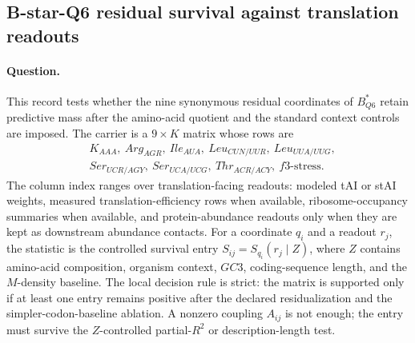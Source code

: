 \subsection{B-star-Q6 residual survival against translation readouts}
\label{sec:bioreality-translation-survival-b-star-q6-survival-matrix}

\paragraph{Question.}
This record tests whether the nine synonymous residual coordinates of $B^*_{Q6}$ retain predictive mass after the amino-acid quotient and the standard context controls are imposed.  The carrier is a $9 \times K$ matrix whose rows are
$$
\begin{aligned}
&K_{AAA},\ Arg_{AGR},\ Ile_{AUA},\ Leu_{CUN/UUR},\ Leu_{UUA/UUG},\\
&Ser_{UCR/AGY},\ Ser_{UCA/UCG},\ Thr_{ACR/ACY},\ f3\text{-stress}.
\end{aligned}
$$
The column index ranges over translation-facing readouts: modeled tAI or stAI weights, measured translation-efficiency rows when available, ribosome-occupancy summaries when available, and protein-abundance readouts only when they are kept as downstream abundance contacts.  For a coordinate $q_i$ and a readout $r_j$, the statistic is the controlled survival entry $S_{ij}=S_{q_i}(r_j\mid Z)$, where $Z$ contains amino-acid composition, organism context, $GC3$, coding-sequence length, and the $M$-density baseline.  The local decision rule is strict: the matrix is supported only if at least one entry remains positive after the declared residualization and the simpler-codon-baseline ablation.  A nonzero coupling $A_{ij}$ is not enough; the entry must survive the $Z$-controlled partial-$R^2$ or description-length test.

